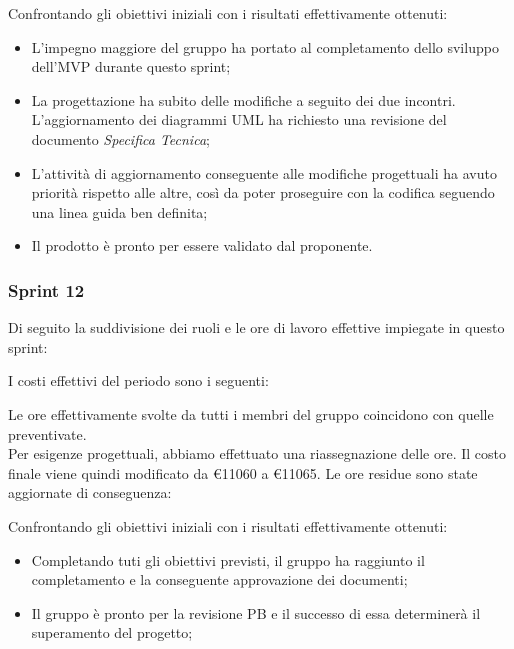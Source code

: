 

Confrontando gli obiettivi iniziali con i risultati effettivamente ottenuti:
\begin{itemize}
    \item L’impegno maggiore del gruppo ha portato al completamento dello sviluppo dell’MVP durante questo sprint;
    \item La progettazione ha subito delle modifiche a seguito dei due incontri. L’aggiornamento dei diagrammi UML ha richiesto una revisione del documento \textit{Specifica Tecnica};
    \item L’attività di aggiornamento conseguente alle modifiche progettuali ha avuto priorità rispetto alle altre, così da poter proseguire con la codifica seguendo una linea guida ben definita;
    \item Il prodotto è pronto per essere validato dal proponente.
\end{itemize}


\subsubsection{Sprint 12}

Di seguito la suddivisione dei ruoli e le ore di lavoro effettive impiegate in questo sprint:



I costi effettivi del periodo sono i seguenti:



Le ore effettivamente svolte da tutti i membri del gruppo coincidono con quelle preventivate.\\
Per esigenze progettuali, abbiamo effettuato una riassegnazione delle ore. Il costo finale viene quindi modificato 
da \euro11060 a \euro11065. Le ore residue sono state aggiornate di conseguenza:



Confrontando gli obiettivi iniziali con i risultati effettivamente ottenuti:
\begin{itemize}
    \item Completando tuti gli obiettivi previsti, il gruppo ha raggiunto il completamento e la conseguente approvazione dei documenti;
    \item Il gruppo è pronto per la revisione PB e il successo di essa determinerà il superamento del progetto;
\end{itemize}


